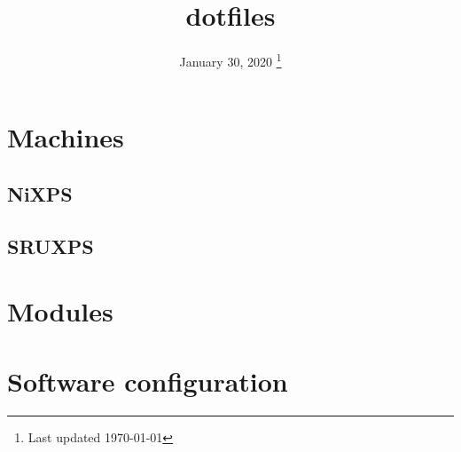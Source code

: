 \documentclass[a4paper,titlepage,xelatex]{tufte-book}
\title{dotfiles}
\date{%
  January 30, 2020
  \thanks{Last updated \today}
}
\begin{document}
\frontmatter
\maketitle
\tableofcontents
\mainmatter

\newpage

\chapter{Machines}
\section{NiXPS}


\section{SRUXPS}



\chapter{Modules}






\chapter{Software configuration}























\backmatter



\printglossaries

\nocite{*}



\newpage
\listoftodos[To-Do]
\end{document}
